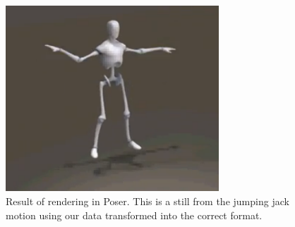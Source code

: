 \documentclass[a4paper]{article}
\begin{document}
\begin{figure}
	\centering
	\includegraphics[width=8cm]{3dRender.PNG}
	\caption{Result of rendering in Poser. This is a still from the jumping jack motion using our data transformed into the correct format.}
	\label{fig:3drender}
\end{figure}

\newpage

\end{document}
